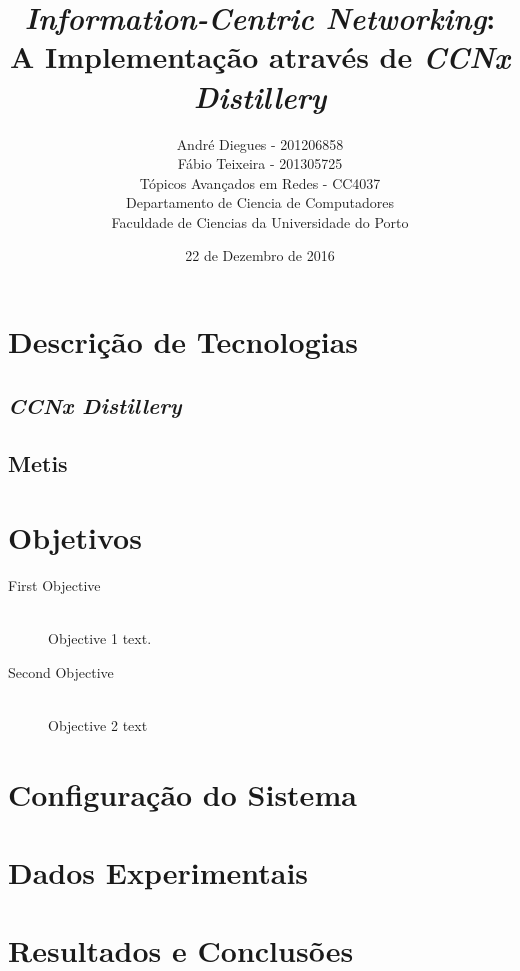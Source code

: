 \documentclass{article}
\title{\textit{Information-Centric Networking}:\\A Implementação através de \textit{CCNx Distillery}} %
\author{André Diegues - 201206858 \\ Fábio Teixeira - 201305725\\ %
		T\'{o}picos Avan\c{c}ados em Redes - CC4037\\
		Departamento de Ciencia de Computadores\\
		Faculdade de Ciencias da Universidade do Porto
}
\date{22 de Dezembro de 2016} %
\begin{document}
\maketitle %

\tableofcontents

\section{Descrição de Tecnologias}

\subsection{\textit{CCNx Distillery}}

\subsection{Metis}

\section{Objetivos}




\begin{description}
\item[First Objective] \hfill \\
Objective 1 text\cite{Smith:2012qr}.
\item[Second Objective] \hfill \\
Objective 2 text
\end{description}

\section{Configuração do Sistema}

\section{Dados Experimentais}

\section{Resultados e Conclusões}





\end{document}
